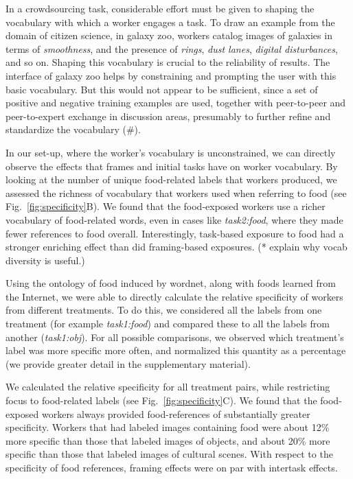 \documentclass[12pt]{article}
\begin{document}
In a crowdsourcing task, considerable effort must be given to shaping the 
vocabulary with which a worker engages a task.  To draw an example from the 
domain of citizen science, in galaxy zoo, workers catalog images of galaxies 
in terms of \textit{smoothness}, and the presence of \textit{rings}, 
\textit{dust lanes}, \textit{digital disturbances}, and so on.  Shaping this 
vocabulary is crucial to the reliability of results.  The interface of
galaxy zoo helps by constraining and prompting the user with this basic 
vocabulary.  But this would not appear to be sufficient, since
a set of positive and negative training examples are used, together with
peer-to-peer and peer-to-expert exchange in discussion areas, presumably to
further refine and standardize the vocabulary (\#).  

In our set-up, where the worker's vocabulary is unconstrained, we can 
directly observe the effects that frames and initial tasks have on worker 
vocabulary.  By looking at the number of unique food-related labels that 
workers produced, we assessed the richness of vocabulary that workers used when
referring to food (see Fig.~\ref{fig:specificity}B).  We found that the 
food-exposed workers use a richer vocabulary of 
food-related words, even in cases like \textit{task2:food}, where they 
made fewer references to food overall.  
Interestingly, task-based exposure to food had a stronger enriching effect 
 than did framing-based exposures. (* explain why vocab 
diversity is useful.) 

Using the ontology of food induced by wordnet, along with foods learned from
the Internet, we were able to directly calculate the relative specificity of 
workers from different treatments.
To do this, we considered all the labels from one treatment
(for example \textit{task1:food}) and compared these to all the labels from 
another (\textit{task1:obj}).  For all possible comparisons, we observed 
which treatment's label was more specific more often, and normalized this
quantity as a percentage (we provide greater detail in the supplementary 
material).

We calculated the relative specificity for all treatment pairs, while 
restricting focus to 
food-related labels (see Fig.~\ref{fig:specificity}C).  We found that 
the food-exposed workers always provided food-references of substantially 
greater specificity.  Workers that had labeled images containing food 
were about 12\% more specific than those that labeled images of objects,
and about 20\% more specific than those that labeled images of cultural 
scenes.  With respect to the specificity of food references, framing effects 
were on par with intertask effects.
\end{document}
